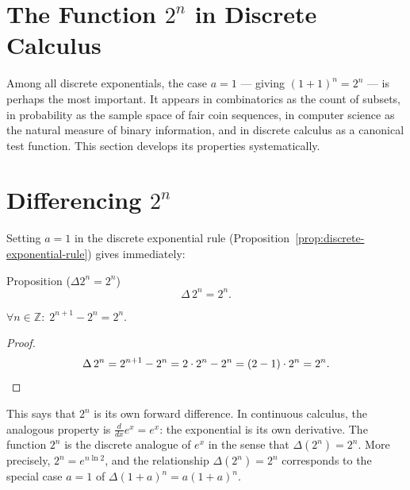 
\section{\texorpdfstring{The Function \(2^n\) in Discrete Calculus}{The Function 2 to the n in Discrete Calculus}}
\label{subsec:two-to-the-n}

Among all discrete exponentials, the case \(a = 1\) --- giving \((1+1)^n = 2^n\)
--- is perhaps the most important. It appears in combinatorics as the count
of subsets, in probability as the sample space of fair coin sequences, in
computer science as the natural measure of binary information, and in discrete
calculus as a canonical test function. This section develops its properties
systematically.

\section*{\texorpdfstring{Differencing \(2^n\)}{Differencing 2 to the n}}

Setting \(a = 1\) in the discrete exponential rule
(Proposition~\ref{prop:discrete-exponential-rule}) gives immediately:

\begin{propositionbox}{Proposition (\(\Delta 2^n = 2^n\))}
\[
\Delta\, 2^n = 2^n.
\]
\end{propositionbox}
\label{prop:delta-two-n}

\begin{remark*}
\(\forall n \in \mathbb{Z}:\; 2^{n+1} - 2^n = 2^n\).
\end{remark*}

\begin{proof}
\[
\Delta\, 2^n = 2^{n+1} - 2^n = 2\cdot 2^n - 2^n = (2-1)\cdot 2^n = 2^n. \qedhere
\]
\end{proof}

\begin{remark*}
This says that \(2^n\) is its own forward difference. In continuous calculus,
the analogous property is \(\tfrac{d}{dx}e^x = e^x\): the exponential is its
own derivative. The function \(2^n\) is the discrete analogue of \(e^x\)
in the sense that \(\Delta(2^n) = 2^n\). More precisely, \(2^n = e^{n \ln 2}\),
and the relationship \(\Delta(2^n) = 2^n\) corresponds to the special case
\(a = 1\) of \(\Delta(1+a)^n = a(1+a)^n\).
\end{remark*}

